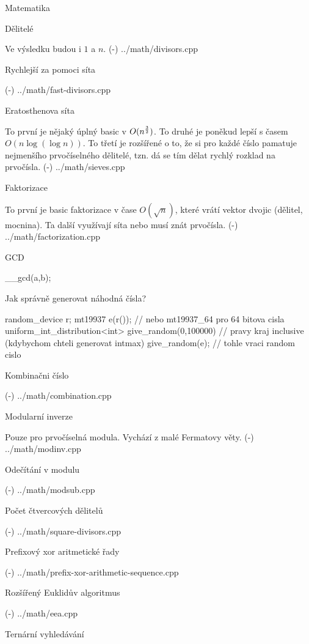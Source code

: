 \newpage

\chap Matematika

\sec Dělitelé 

Ve výsledku budou i $1$ a $n$.
\verbinput (-) ../math/divisors.cpp

\secc Rychlejší za pomoci síta 

\verbinput (-) ../math/fast-divisors.cpp

\sec Eratosthenova síta 

To první je nějaký úplný basic v $O(n^{3 \over 2})$. To druhé je poněkud lepší s časem $O(n\log(\log n))$. To třetí je rozšířené o to, že si pro každé číslo pamatuje nejmenšího prvočíselného dělitelé, tzn. dá se tím dělat rychlý rozklad na prvočísla.
\verbinput (-) ../math/sieves.cpp

\sec Faktorizace 

To první je basic faktorizace v čase $O(\sqrt n)$, které vrátí vektor dvojic (dělitel, mocnina). Ta další využívají síta nebo musí znát prvočísla.
\verbinput (-) ../math/factorization.cpp

\sec GCD 

\begtt
__gcd(a,b);
\endtt

\sec Jak správně generovat náhodná čísla? 

\begtt
  random_device r;
  mt19937 e(r()); // nebo mt19937_64 pro 64 bitova cisla
  uniform_int_distribution<int> give_random(0,100000) // pravy kraj inclusive (kdybychom chteli generovat intmax)
  give_random(e); // tohle vraci random cislo
\endtt

\sec Kombinačni číslo 

\verbinput (-) ../math/combination.cpp

\sec Modularní inverze 

Pouze pro prvočíselná modula. Vychází z malé Fermatovy věty.
\verbinput (-) ../math/modinv.cpp

\sec Odečítání v modulu 

\verbinput (-) ../math/modsub.cpp

\sec Počet čtvercových dělitelů 

\verbinput (-) ../math/square-divisors.cpp

\sec Prefixový xor aritmetické řady 

\verbinput (-) ../math/prefix-xor-arithmetic-sequence.cpp

\sec Rozšířený Euklidův algoritmus 

\verbinput (-) ../math/eea.cpp

\sec Ternární vyhledávání 

